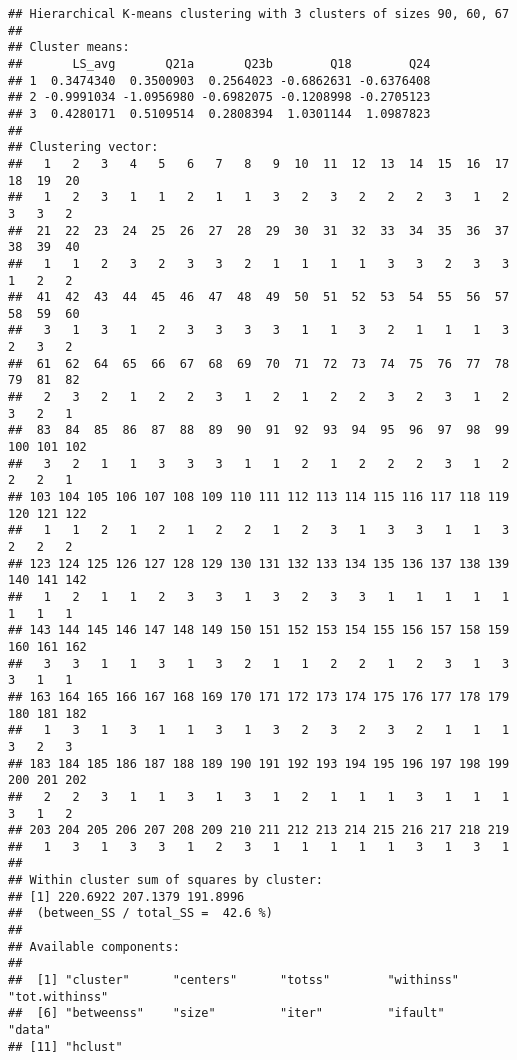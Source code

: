 \documentclass[
]{article}
\begin{document}
\begin{verbatim}
## Hierarchical K-means clustering with 3 clusters of sizes 90, 60, 67
## 
## Cluster means:
##       LS_avg       Q21a       Q23b        Q18        Q24
## 1  0.3474340  0.3500903  0.2564023 -0.6862631 -0.6376408
## 2 -0.9991034 -1.0956980 -0.6982075 -0.1208998 -0.2705123
## 3  0.4280171  0.5109514  0.2808394  1.0301144  1.0987823
## 
## Clustering vector:
##   1   2   3   4   5   6   7   8   9  10  11  12  13  14  15  16  17  18  19  20 
##   1   2   3   1   1   2   1   1   3   2   3   2   2   2   3   1   2   3   3   2 
##  21  22  23  24  25  26  27  28  29  30  31  32  33  34  35  36  37  38  39  40 
##   1   1   2   3   2   3   3   2   1   1   1   1   3   3   2   3   3   1   2   2 
##  41  42  43  44  45  46  47  48  49  50  51  52  53  54  55  56  57  58  59  60 
##   3   1   3   1   2   3   3   3   3   1   1   3   2   1   1   1   3   2   3   2 
##  61  62  64  65  66  67  68  69  70  71  72  73  74  75  76  77  78  79  81  82 
##   2   3   2   1   2   2   3   1   2   1   2   2   3   2   3   1   2   3   2   1 
##  83  84  85  86  87  88  89  90  91  92  93  94  95  96  97  98  99 100 101 102 
##   3   2   1   1   3   3   3   1   1   2   1   2   2   2   3   1   2   2   2   1 
## 103 104 105 106 107 108 109 110 111 112 113 114 115 116 117 118 119 120 121 122 
##   1   1   2   1   2   1   2   2   1   2   3   1   3   3   1   1   3   2   2   2 
## 123 124 125 126 127 128 129 130 131 132 133 134 135 136 137 138 139 140 141 142 
##   1   2   1   1   2   3   3   1   3   2   3   3   1   1   1   1   1   1   1   1 
## 143 144 145 146 147 148 149 150 151 152 153 154 155 156 157 158 159 160 161 162 
##   3   3   1   1   3   1   3   2   1   1   2   2   1   2   3   1   3   3   1   1 
## 163 164 165 166 167 168 169 170 171 172 173 174 175 176 177 178 179 180 181 182 
##   1   3   1   3   1   1   3   1   3   2   3   2   3   2   1   1   1   3   2   3 
## 183 184 185 186 187 188 189 190 191 192 193 194 195 196 197 198 199 200 201 202 
##   2   2   3   1   1   3   1   3   1   2   1   1   1   3   1   1   1   3   1   2 
## 203 204 205 206 207 208 209 210 211 212 213 214 215 216 217 218 219 
##   1   3   1   3   3   1   2   3   1   1   1   1   1   3   1   3   1 
## 
## Within cluster sum of squares by cluster:
## [1] 220.6922 207.1379 191.8996
##  (between_SS / total_SS =  42.6 %)
## 
## Available components:
## 
##  [1] "cluster"      "centers"      "totss"        "withinss"     "tot.withinss"
##  [6] "betweenss"    "size"         "iter"         "ifault"       "data"        
## [11] "hclust"
\end{verbatim}
\end{document}
